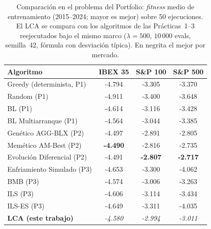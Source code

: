 \begin{table}[h!]
\centering
\caption{Comparación en el problema del Portfolio: \emph{fitness} medio de
entrenamiento (2015--2024; mayor es mejor) sobre 50 ejecuciones. El LCA se compara
con los algoritmos de las Prácticas~1--3 reejecutados bajo el mismo marco
($\lambda=500$, $10\,000$ evals, semilla~42, fórmula con desviación típica). En
negrita el mejor por mercado.}
\label{tab:portfolio}
\begin{tabular}{lccc}
\toprule
Algoritmo & IBEX 35 & S\&P 100 & S\&P 500 \\
\midrule
Greedy (determinista, P1)        & -4.794 & -3.305 & -3.370 \\
Random (P1)                      & -4.911 & -3.400 & -3.648 \\
BL (P1)                          & -4.614 & -3.116 & -3.428 \\
BL Multiarranque (P1)            & -4.564 & -3.044 & -3.385 \\
Genético AGG-BLX (P2)            & -4.497 & -2.891 & -2.805 \\
Memético AM-Best (P2)            & \textbf{-4.490} & -2.816 & -2.735 \\
Evolución Diferencial (P2)       & -4.491 & \textbf{-2.807} & \textbf{-2.717} \\
Enfriamiento Simulado (P3)       & -4.653 & -3.300 & -4.062 \\
BMB (P3)                         & -4.574 & -3.006 & -3.263 \\
ILS (P3)                         & -4.606 & -3.114 & -3.434 \\
ILS-ES (P3)                      & -4.649 & -3.311 & -4.035 \\
\textbf{LCA (este trabajo)}      & \textit{-4.580} & \textit{-2.994} & \textit{-3.011} \\
\bottomrule
\end{tabular}
\end{table}

